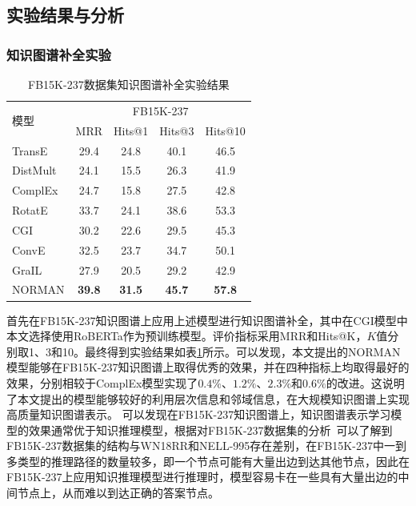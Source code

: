 \documentclass[algorithmlist, AutoFakeBold, AutoFakeSlant, figurelist, tablelist, nomlist, engineering]{seuthesix}
\begin{document}
\subsection{实验结果与分析}
\subsubsection{知识图谱补全实验}
\begin{table}[t]
  \centering
  \caption{FB15K-237数据集知识图谱补全实验结果}
  \begin{tabular*}{0.95\textwidth}{@{\extracolsep{\fill}}lcccc}
    \toprule[1pt]
    \multirow{2}{*}{模型} & \multicolumn{4}{c}{FB15K-237} \\
      & MRR & Hits@1 & Hits@3 & Hits@10 \\ \hline
    TransE & 29.4 & 24.8 & 40.1 & 46.5 \\
    DistMult & 24.1 & 15.5 & 26.3 & 41.9 \\
    ComplEx & 24.7 & 15.8 & 27.5 & 42.8 \\
    RotatE & 33.7 & 24.1 & 38.6  & 53.3 \\
    CGI & 30.2 & 22.6 & 29.5 & 45.3 \\
    ConvE & 32.5 & 23.7 & 34.7 & 50.1 \\
    GraIL & 27.9 & 20.5 & 29.2 & 42.9 \\
    NORMAN & \textbf{39.8} & \textbf{31.5} & \textbf{45.7} & \textbf{57.8} \\
    \bottomrule[1pt]
  \end{tabular*}
  \label{Experiment1_FB15K-237}
\end{table}

首先在FB15K-237知识图谱上应用上述模型进行知识图谱补全，其中在CGI模型中本文选择使用RoBERTa作为预训练模型。评价指标采用MRR和Hits@K，$K$值分别取1、3和10。最终得到实验结果如表\ref{Experiment1_FB15K-237}所示。可以发现，本文提出的NORMAN模型能够在FB15K-237知识图谱上取得优秀的效果，并在四种指标上均取得最好的效果，分别相较于ComplEx模型实现了$0.4\%$、$1.2\%$、$2.3\%$和$0.6\%$的改进。这说明了本文提出的模型能够较好的利用层次信息和邻域信息，在大规模知识图谱上实现高质量知识图谱表示。
可以发现在FB15K-237知识图谱上，知识图谱表示学习模型的效果通常优于知识推理模型，根据对FB15K-237数据集的分析~\cite{wan2021reasoning}可以了解到FB15K-237数据集的结构与WN18RR和NELL-995存在差别，在FB15K-237中一到多类型的推理路径的数量较多，即一个节点可能有大量出边到达其他节点，因此在FB15K-237上应用知识推理模型进行推理时，模型容易卡在一些具有大量出边的中间节点上，从而难以到达正确的答案节点。
\end{document}
